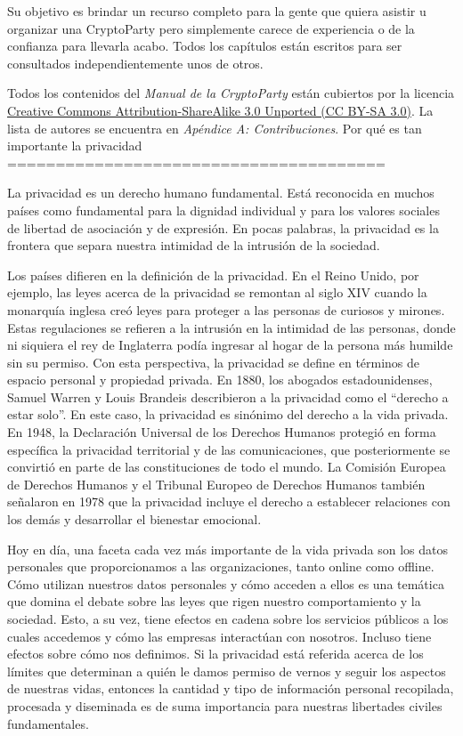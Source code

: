 \documentclass[10pt,a5paper,twoside,,]{book}
\begin{document}
Su objetivo es brindar un recurso completo para la gente que quiera
asistir u organizar una CryptoParty pero simplemente carece de
experiencia o de la confianza para llevarla acabo. Todos los capítulos
están escritos para ser consultados independientemente unos de otros.

Todos los contenidos del \emph{Manual de la CryptoParty} están cubiertos
por la licencia
\href{https://creativecommons.org/licenses/by-sa/3.0/}{Creative Commons
Attribution-ShareAlike 3.0 Unported (CC BY-SA 3.0)}. La lista de autores
se encuentra en \emph{Apéndice A: Contribuciones}. Por qué es tan
importante la privacidad =======================================

La privacidad es un derecho humano fundamental. Está reconocida en
muchos países como fundamental para la dignidad individual y para los
valores sociales de libertad de asociación y de expresión. En pocas
palabras, la privacidad es la frontera que separa nuestra intimidad de
la intrusión de la sociedad.

Los países difieren en la definición de la privacidad. En el Reino
Unido, por ejemplo, las leyes acerca de la privacidad se remontan al
siglo XIV cuando la monarquía inglesa creó leyes para proteger a las
personas de curiosos y mirones. Estas regulaciones se refieren a la
intrusión en la intimidad de las personas, donde ni siquiera el rey de
Inglaterra podía ingresar al hogar de la persona más humilde sin su
permiso. Con esta perspectiva, la privacidad se define en términos de
espacio personal y propiedad privada. En 1880, los abogados
estadounidenses, Samuel Warren y Louis Brandeis describieron a la
privacidad como el ``derecho a estar solo''. En este caso, la privacidad
es sinónimo del derecho a la vida privada. En 1948, la Declaración
Universal de los Derechos Humanos protegió en forma específica la
privacidad territorial y de las comunicaciones, que posteriormente se
convirtió en parte de las constituciones de todo el mundo. La Comisión
Europea de Derechos Humanos y el Tribunal Europeo de Derechos Humanos
también señalaron en 1978 que la privacidad incluye el derecho a
establecer relaciones con los demás y desarrollar el bienestar
emocional.

Hoy en día, una faceta cada vez más importante de la vida privada son
los datos personales que proporcionamos a las organizaciones, tanto
online como offline. Cómo utilizan nuestros datos personales y cómo
acceden a ellos es una temática que domina el debate sobre las leyes que
rigen nuestro comportamiento y la sociedad. Esto, a su vez, tiene
efectos en cadena sobre los servicios públicos a los cuales accedemos y
cómo las empresas interactúan con nosotros. Incluso tiene efectos sobre
cómo nos definimos. Si la privacidad está referida acerca de los límites
que determinan a quién le damos permiso de vernos y seguir los aspectos
de nuestras vidas, entonces la cantidad y tipo de información personal
recopilada, procesada y diseminada es de suma importancia para nuestras
libertades civiles fundamentales.
\end{document}
